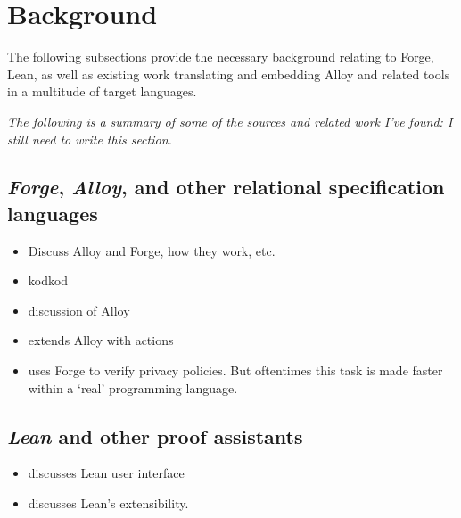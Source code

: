 \section{Background}

The following subsections provide the necessary background relating to Forge, Lean, as well as existing work translating and embedding Alloy and related tools in a multitude of target languages. 

\emph{\color{OliveGreen} The following is a summary of some of the sources and related work I've found: I still need to write this section.}

\subsection{\emph{Forge}, \emph{Alloy}, and other relational specification languages}\label{sec:bg-forge}
{\color{OliveGreen}
\begin{itemize}
    \item Discuss Alloy and Forge, how they work, etc. 
    \item \cite{torlak2007kodkod} kodkod
    \item \cite{torlak2013applications} discussion of Alloy
    \item \cite{frias2005dynalloy} extends Alloy with actions
    \item \cite{srajesh-honorsthesis,lzhu-honorsthesis} uses Forge to verify privacy policies. But oftentimes this task is made faster within a `real' programming language.
\end{itemize}}

\subsection{\emph{Lean} and other proof assistants}\label{sec:bg-lean}
{\color{OliveGreen}
\begin{itemize}
    \item \cite{nawrocki2023extensible} discusses Lean user interface
    \item \cite{moura2021lean} discusses Lean's extensibility. 
\end{itemize}}

